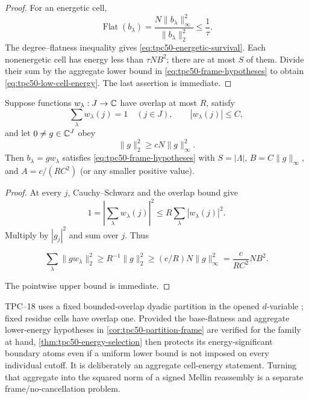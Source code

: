 \begin{proof}
For an energetic cell,
\begin{equation}
 \operatorname{Flat}(b_\lambda)
 =\frac{N\|b_\lambda\|_\infty^2}
       {\|b_\lambda\|_2^2}
 \le\frac1\tau.
 \label{eq:tpc50-energy-flatness}
\end{equation}
The degree--flatness inequality gives
\eqref{eq:tpc50-energetic-survival}.  Each nonenergetic cell has energy
less than \(\tau NB^2\); there are at most \(S\) of them.  Divide their
sum by the aggregate lower bound in
\eqref{eq:tpc50-frame-hypotheses} to obtain
\eqref{eq:tpc50-low-cell-energy}.  The last assertion is immediate.
\end{proof}

\begin{corollary}
\label{cor:tpc50-partition-frame}
Suppose functions \(w_\lambda:J\to\mathbb C\) have overlap at most \(R\),
satisfy
\begin{equation}
 \sum_\lambda w_\lambda(j)=1
 \quad(j\in J),
 \qquad
 |w_\lambda(j)|\le C,
 \label{eq:tpc50-partition-unity}
\end{equation}
and let \(0\ne g\in\mathbb C^J\) obey
\begin{equation}
 \|g\|_2^2\ge cN\|g\|_\infty^2.
 \label{eq:tpc50-base-flatness}
\end{equation}
Then \(b_\lambda=gw_\lambda\) satisfies
\eqref{eq:tpc50-frame-hypotheses} with
\(S=|\Lambda|\), \(B=C\|g\|_\infty\), and
\(A=c/(RC^2)\) (or any smaller positive value).
\end{corollary}

\begin{proof}
At every \(j\), Cauchy--Schwarz and the overlap bound give
\begin{equation}
 1=\left|\sum_\lambda w_\lambda(j)\right|^2
 \le R\sum_\lambda|w_\lambda(j)|^2.
 \label{eq:tpc50-square-frame-pointwise}
\end{equation}
Multiply by \(|g_j|^2\) and sum over \(j\).  Thus

\[
 \sum_\lambda\|gw_\lambda\|_2^2
 \ge R^{-1}\|g\|_2^2
 \ge (c/R)N\|g\|_\infty^2
 =\frac{c}{RC^2}NB^2.
\]

The pointwise upper bound is immediate.
\end{proof}

TPC--18 uses a fixed bounded-overlap dyadic partition in the opened
\(d\)-variable \citep{WangTPC18}; fixed residue cells have overlap one.
Provided the base-flatness and aggregate lower-energy hypotheses in
\cref{cor:tpc50-partition-frame} are verified for the family at hand,
\cref{thm:tpc50-energy-selection} then protects its energy-significant
boundary atoms even if a uniform lower bound is not imposed on every
individual cutoff.  It is deliberately an aggregate cell-energy
statement.  Turning that aggregate into the squared norm of a signed
Mellin reassembly is a separate frame/no-cancellation problem.
